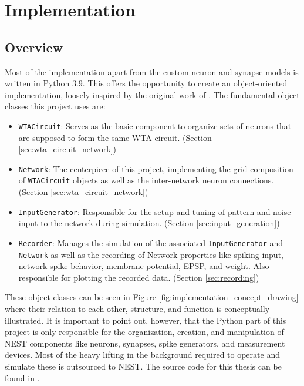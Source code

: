 
\chapter{Implementation} %

\label{Chapter4} %


\section{Overview}
Most of the implementation apart from the custom neuron and synapse models is written in Python 3.9. This offers the opportunity to create an object-oriented implementation, loosely inspired by the original work of \parencite{klampfl_maass_2013}. The fundamental object classes this project uses are:
\begin{itemize}
    \item \texttt{WTACircuit}: Serves as the basic component to organize sets of neurons that are supposed to form the same WTA circuit. (Section \ref{sec:wta_circuit_network})
    \item \texttt{Network}: The centerpiece of this project, implementing the grid composition of \texttt{WTACircuit} objects as well as the inter-network neuron connections. (Section \ref{sec:wta_circuit_network})
    \item \texttt{InputGenerator}: Responsible for the setup and tuning of pattern and noise input to the network during simulation. (Section \ref{sec:input_generation})
    \item \texttt{Recorder}: Manages the simulation of the associated \texttt{InputGenerator} and \texttt{Network} as well as the recording of Network properties like spiking input, network spike behavior, membrane potential, EPSP, and weight. Also responsible for plotting the recorded data. (Section \ref{sec:recording})
\end{itemize}
These object classes can be seen in Figure \ref{fig:implementation_concept_drawing} where their relation to each other, structure, and function is conceptually illustrated. It is important to point out, however, that the Python part of this project is only responsible for the organization, creation, and manipulation of NEST components like neurons, synapses, spike generators, and measurement devices. Most of the heavy lifting in the background required to operate and simulate these is outsourced to NEST. The source code for this thesis can be found in \parencite{michau_2022}.
